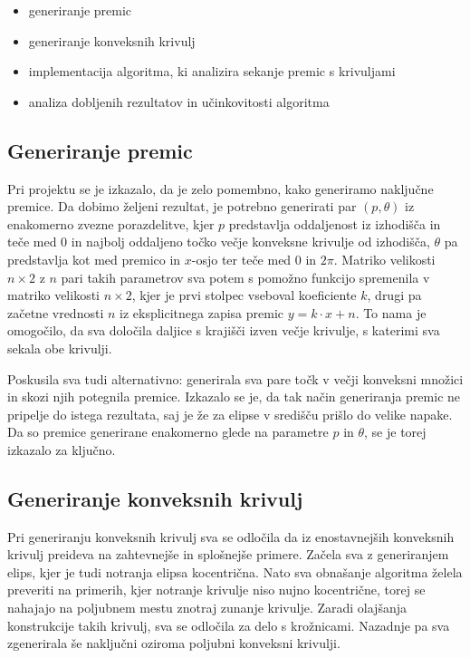 \documentclass[a4paper]{article}
\begin{document}
\begin{itemize}
\item generiranje premic
\item generiranje konveksnih krivulj
\item implementacija algoritma, ki analizira sekanje premic s krivuljami
\item analiza dobljenih rezultatov in učinkovitosti algoritma
\end{itemize}




\subsection{Generiranje premic}
Pri projektu se je izkazalo, da je zelo pomembno, kako generiramo naključne premice. Da dobimo željeni rezultat, je potrebno generirati par $(p, \theta)$ iz enakomerno zvezne porazdelitve, kjer $p$ predstavlja oddaljenost iz izhodišča in teče med $0$ in najbolj oddaljeno točko večje konveksne krivulje od izhodišča, $\theta$ pa predstavlja kot med premico in $x$-osjo ter teče med $0$ in $2\pi$. Matriko velikosti $n\times2$ z $n$ pari takih parametrov sva potem s pomožno funkcijo spremenila v matriko velikosti $n\times2$, kjer je prvi stolpec vseboval koeficiente $k$, drugi pa začetne vrednosti $n$ iz eksplicitnega zapisa premic $y=k\cdot x+n$. To nama je omogočilo, da sva določila daljice s krajišči izven večje krivulje, s katerimi sva sekala obe krivulji.

Poskusila sva tudi alternativno: generirala sva pare točk v večji konveksni množici in skozi njih potegnila premice. Izkazalo se je, da tak način generiranja premic ne pripelje do istega rezultata, saj je že za elipse v središču prišlo do velike napake. Da so premice generirane enakomerno glede na parametre $p$ in $\theta$, se je torej izkazalo za ključno.

\subsection{Generiranje konveksnih krivulj}
Pri generiranju konveksnih krivulj sva se odločila da iz enostavnejših konveksnih krivulj preideva na zahtevnejše in splošnejše primere. Začela sva z generiranjem elips, kjer je tudi notranja elipsa kocentrična. Nato sva obnašanje algoritma želela preveriti na primerih, kjer notranje krivulje niso nujno kocentrične, torej se nahajajo na poljubnem mestu znotraj zunanje krivulje. Zaradi olajšanja konstrukcije takih krivulj, sva se odločila za delo s krožnicami. Nazadnje pa sva zgenerirala še naključni oziroma poljubni konveksni krivulji. 
\end{document}
